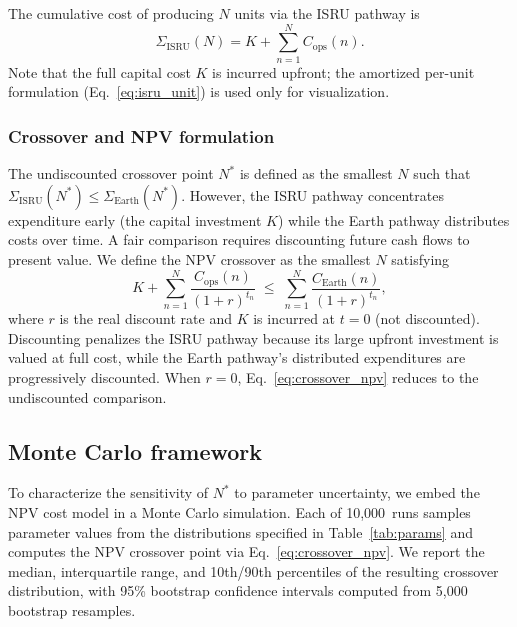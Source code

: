 \documentclass[preprint,12pt]{elsarticle}
\begin{document}
The cumulative cost of producing $N$ units via the ISRU pathway is
\begin{equation}
  \Sigma_{\mathrm{ISRU}}(N) = K + \sum_{n=1}^{N} C_{\mathrm{ops}}(n).
  \label{eq:isru_cum}
\end{equation}
Note that the full capital cost $K$ is incurred upfront; the amortized per-unit formulation (Eq.~\ref{eq:isru_unit}) is used only for visualization.

\subsubsection{Crossover and NPV formulation}

The undiscounted crossover point $N^*$ is defined as the smallest $N$ such that $\Sigma_{\mathrm{ISRU}}(N^*) \leq \Sigma_{\mathrm{Earth}}(N^*)$. However, the ISRU pathway concentrates expenditure early (the capital investment $K$) while the Earth pathway distributes costs over time. A fair comparison requires discounting future cash flows to present value. We define the NPV crossover as the smallest $N$ satisfying
\begin{equation}
  K + \sum_{n=1}^{N} \frac{C_{\mathrm{ops}}(n)}{(1+r)^{t_n}} \;\leq\; \sum_{n=1}^{N} \frac{C_{\mathrm{Earth}}(n)}{(1+r)^{t_n}},
  \label{eq:crossover_npv}
\end{equation}
where $r$ is the real discount rate and $K$ is incurred at $t = 0$ (not discounted). Discounting penalizes the ISRU pathway because its large upfront investment is valued at full cost, while the Earth pathway's distributed expenditures are progressively discounted. When $r = 0$, Eq.~\ref{eq:crossover_npv} reduces to the undiscounted comparison.

\subsection{Monte Carlo framework}

To characterize the sensitivity of $N^*$ to parameter uncertainty, we embed the NPV cost model in a Monte Carlo simulation. Each of 10{,}000~runs samples parameter values from the distributions specified in Table~\ref{tab:params} and computes the NPV crossover point via Eq.~\ref{eq:crossover_npv}. We report the median, interquartile range, and 10th/90th percentiles of the resulting crossover distribution, with 95\% bootstrap confidence intervals computed from 5{,}000 bootstrap resamples.
\end{document}
